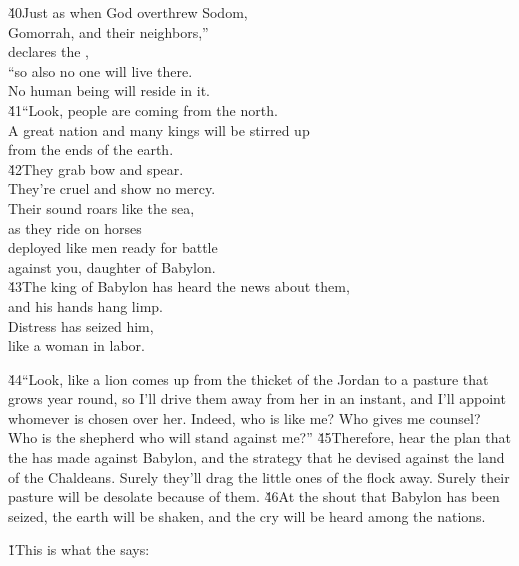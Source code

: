 \begin{poetry}
\poeml \v{40}Just as when God overthrew Sodom, \\
\poemll    Gomorrah, and their neighbors,'' \\
\poemlll       declares the , \\
\poeml ``so also no one will live there. \\
\poemll    No human being will reside in it. \\
\poeml \v{41}``Look, people are coming from the north. \\
\poemll    A great nation and many kings will be stirred up \\
\poemlll       from the ends of the earth. \\
\poeml \v{42}They grab bow and spear. \\
\poemll    They're cruel and show no mercy. \\
\poeml Their sound roars like the sea, \\
\poemll    as they ride on horses \\
\poeml deployed like men ready for battle \\
\poemll    against you, daughter of Babylon. \\
\poeml \v{43}The king of Babylon has heard the news about them, \\
\poemll    and his hands hang limp. \\
\poeml Distress has seized him, \\
\poemll    like a woman in labor.
\end{poetry}

\v{44}``Look, like a lion comes up from the thicket of the Jordan to a pasture that grows year round, so I'll drive them away from her in an instant, and I'll appoint whomever is chosen over her. Indeed, who is like me? Who gives me counsel? Who is the shepherd who will stand against me?'' \v{45}Therefore, hear the plan that the  has made against Babylon, and the strategy that he devised against the land of the Chaldeans. Surely they'll drag the little ones of the flock away. Surely their pasture will be desolate because of them. \v{46}At the shout that Babylon has been seized, the earth will be shaken, and the cry will be heard among the nations.

\v{1}This is what the  says:

